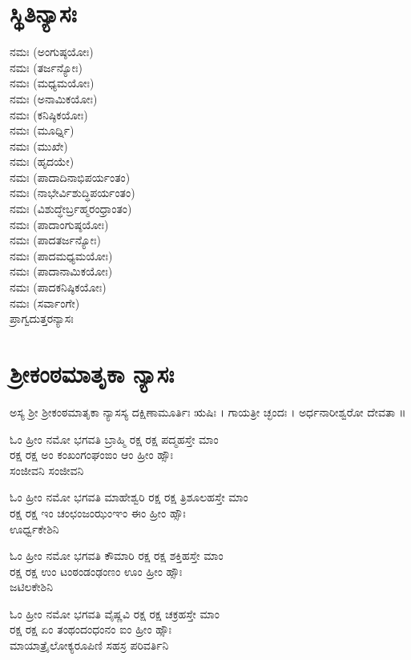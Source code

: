 \section{ಸ್ಥಿತಿನ್ಯಾಸಃ}
 ನಮಃ (ಅಂಗುಷ್ಠಯೋಃ)\\
 ನಮಃ (ತರ್ಜನ್ಯೋಃ)\\
 ನಮಃ (ಮಧ್ಯಮಯೋಃ)\\
 ನಮಃ (ಅನಾಮಿಕಯೋಃ)\\
 ನಮಃ (ಕನಿಷ್ಠಿಕಯೋಃ)\\
 ನಮಃ (ಮೂರ್ಧ್ನಿ)\\
 ನಮಃ (ಮುಖೇ)\\
 ನಮಃ (ಹೃದಯೇ)\\
 ನಮಃ (ಪಾದಾದಿನಾಭಿಪರ್ಯಂತಂ)\\
 ನಮಃ (ನಾಭೇರ್ವಿಶುದ್ಧಿಪರ್ಯಂತಂ)\\
 ನಮಃ (ವಿಶುದ್ಧೇರ್ಬ್ರಹ್ಮರಂಧ್ರಾಂತಂ)\\
 ನಮಃ (ಪಾದಾಂಗುಷ್ಠಯೋಃ)\\
 ನಮಃ (ಪಾದತರ್ಜನ್ಯೋಃ)\\
 ನಮಃ (ಪಾದಮಧ್ಯಮಯೋಃ)\\
 ನಮಃ (ಪಾದಾನಾಮಿಕಯೋಃ)\\
 ನಮಃ (ಪಾದಕನಿಷ್ಠಿಕಯೋಃ)\\
 ನಮಃ (ಸರ್ವಾಂಗೇ)\\
ಪ್ರಾಗ್ವದುತ್ತರನ್ಯಾಸಃ
\section{ಶ್ರೀಕಂಠಮಾತೃಕಾ ನ್ಯಾಸಃ}
ಅಸ್ಯ ಶ್ರೀ ಶ್ರೀಕಂಠಮಾತೃಕಾ ನ್ಯಾಸಸ್ಯ ದಕ್ಷಿಣಾಮೂರ್ತಿಃ ಋಷಿಃ । ಗಾಯತ್ರೀ ಚ್ಛಂದಃ । ಅರ್ಧನಾರೀಶ್ವರೋ ದೇವತಾ ॥

ಓಂ ಹ್ರೀಂ ನಮೋ ಭಗವತಿ ಬ್ರಾಹ್ಮಿ ರಕ್ಷ ರಕ್ಷ ಪದ್ಮಹಸ್ತೇ ಮಾಂ\\ ರಕ್ಷ ರಕ್ಷ  ಅಂ ಕಂಖಂಗಂಘಂಙಂ ಆಂ ಹ್ರೀಂ ಹ್ಸೌಃ \\ಸಂಜೀವನಿ ಸಂಜೀವನಿ  

ಓಂ ಹ್ರೀಂ ನಮೋ ಭಗವತಿ ಮಾಹೇಶ್ವರಿ ರಕ್ಷ ರಕ್ಷ ತ್ರಿಶೂಲಹಸ್ತೇ ಮಾಂ \\ರಕ್ಷ ರಕ್ಷ ಇಂ ಚಂಛಂಜಂಝಂಞಂ ಈಂ  ಹ್ರೀಂ ಹ್ಸೌಃ\\ ಊರ್ಧ್ವಕೇಶಿನಿ 

ಓಂ ಹ್ರೀಂ ನಮೋ ಭಗವತಿ ಕೌಮಾರಿ ರಕ್ಷ ರಕ್ಷ ಶಕ್ತಿಹಸ್ತೇ ಮಾಂ\\ ರಕ್ಷ ರಕ್ಷ ಉಂ ಟಂಠಂಡಂಢಂಣಂ ಊಂ  ಹ್ರೀಂ ಹ್ಸೌಃ\\ ಜಟಿಲಕೇಶಿನಿ 

ಓಂ ಹ್ರೀಂ ನಮೋ ಭಗವತಿ ವೈಷ್ಣವಿ ರಕ್ಷ ರಕ್ಷ ಚಕ್ರಹಸ್ತೇ ಮಾಂ\\ ರಕ್ಷ ರಕ್ಷ ಏಂ ತಂಥಂದಂಧಂನಂ ಐಂ ಹ್ರೀಂ ಹ್ಸೌಃ\\ ಮಾಯಾತ್ರೈಲೋಕ್ಯರೂಪಿಣಿ ಸಹಸ್ರ ಪರಿವರ್ತಿನಿ 

